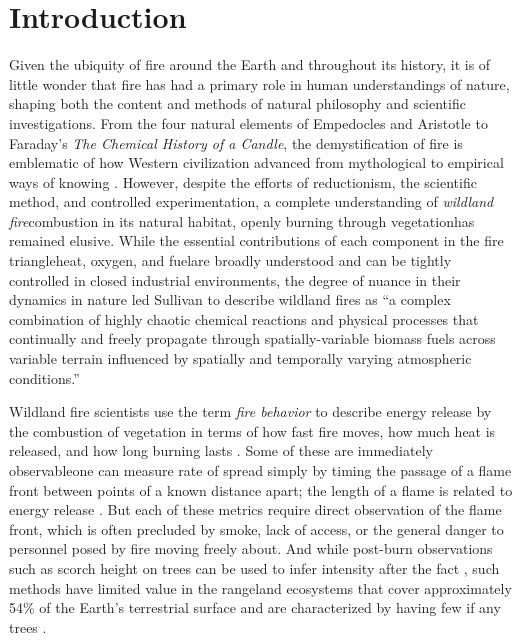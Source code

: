 \documentclass[fire,article,submit,oneauthor,pdftex]{Definitions/mdpi}
\begin{document}
\section{Introduction}

Given the ubiquity of fire around the Earth and throughout its history, it is of little wonder that fire has had a primary role in human understandings of nature, shaping both the content and methods of natural philosophy and scientific investigations. 
From the four natural elements of Empedocles and Aristotle to Faraday's \emph{The Chemical History of a Candle}, the demystification of fire is emblematic of how Western civilization advanced from mythological to empirical ways of knowing \cite{pyne2016}. 
However, despite the efforts of reductionism, the scientific method, and controlled experimentation, a complete understanding of \emph{wildland fire}\textemdash combustion in its natural habitat, openly burning through vegetation\textemdash has remained elusive. 
While the essential contributions of each component in the fire triangle\textemdash heat, oxygen, and fuel\textemdash are broadly understood and can be tightly controlled in closed industrial environments, the degree of nuance in their dynamics in nature led Sullivan \cite[][p. 133]{sullivan2017} to describe wildland fires as ``a complex combination of highly chaotic chemical reactions and physical processes that continually and freely propagate through spatially-variable biomass fuels across variable terrain influenced by spatially and temporally varying atmospheric conditions.''

Wildland fire scientists use the term \emph{fire behavior} to describe energy release by the combustion of vegetation in terms of how fast fire moves, how much heat is released, and how long burning lasts \cite{mcgranahan2021a, finney2021}. 
Some of these are immediately observable\textemdash one can measure rate of spread simply by timing the passage of a flame front between points of a known distance apart; the length of a flame is related to energy release \cite{rothermel1980}. 
But each of these metrics require direct observation of the flame front, which is often precluded by smoke, lack of access, or the general danger to personnel posed by fire moving freely about. 
And while post-burn observations such as scorch height on trees can be used to infer intensity after the fact \cite{rothermel1980}, such methods have limited value in the rangeland ecosystems that cover approximately 54\% of the Earth's terrestrial surface and are characterized by having few if any trees \cite{ilri2021}. 
\end{document}
